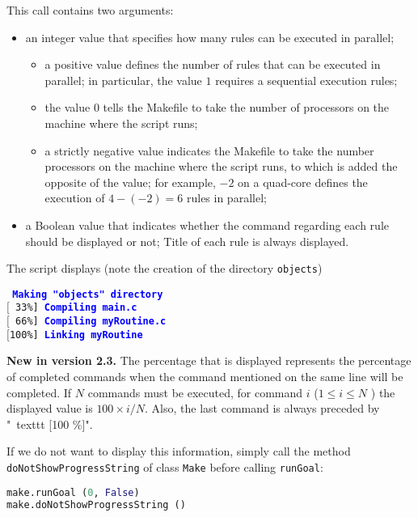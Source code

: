 \documentclass[a4paper,11pt]{extarticle}
\begin{document}
This call contains two arguments:
\begin{itemize}
\item an integer value that specifies how many rules can be executed in parallel;
  \begin{itemize}
  \item a positive value defines the number of rules that can be executed in parallel; in particular, the value $1$ requires a sequential execution rules;
  \item the value $0$ tells the Makefile to take the number of processors on the machine where the script runs;
  \item a strictly negative value indicates the Makefile to take the number processors on the machine where the script runs, to which is added the opposite of the value; for example, $-2$ on a quad-core defines the execution of $4-(-2) = 6$ rules in parallel;
  \end{itemize}
\item a Boolean value that indicates whether the command regarding each rule should be displayed or not; Title of each rule is always displayed.
\end{itemize}

The script displays (note the creation of the directory \texttt{objects})

\begin{mdframed}[hidealllines=true,backgroundcolor=lightgray!20]
\tt\footnotesize
\textcolor{blue}{\bf Making "objects" directory}\\
$[$~33\%]~\textcolor{blue}{\bf Compiling main.c}\\
$[$~66\%]~\textcolor{blue}{\bf Compiling myRoutine.c}\\
$[$100\%]~\textcolor{blue}{\bf Linking myRoutine}
\end{mdframed}

{\bf New in version 2.3.}\label{affichagePourcentage} The percentage that is displayed represents the percentage of completed commands when the command mentioned on the same line will be completed. If $N$ commands must be executed, for command $i$ ($1 \leqslant i \leqslant N$ ) the displayed value is $100 \times i / N$. Also, the last command is always preceded by "\ texttt {[100 \%]}".

If we do not want to display this information, simply call the method \texttt{doNotShowProgressString}  of class \texttt{Make} before calling \texttt{runGoal}:

\begin{lstlisting}[language=py]
make.runGoal (0, False)
make.doNotShowProgressString ()
\end{lstlisting}
\end{document}
